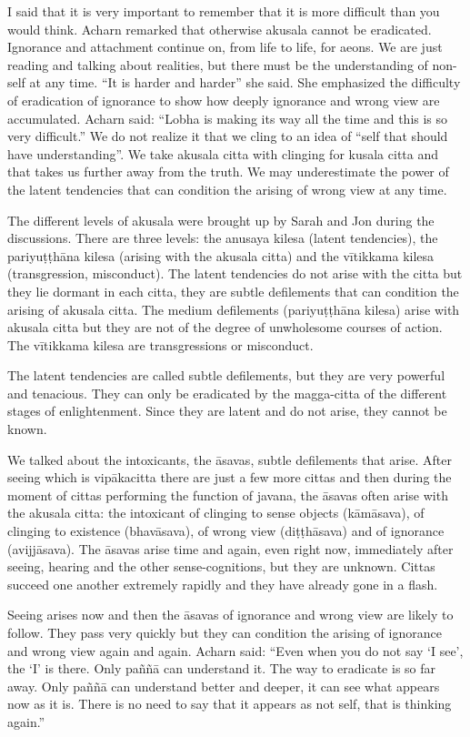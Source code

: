 {I said that it is very
important to remember that it is more difficult than you
would think. Acharn remarked that otherwise akusala cannot be
eradicated. Ignorance and attachment continue on, from life to life, for
aeons. We are just reading and talking about realities, but there must
be the understanding of non-self at any time. ``It is harder and
harder'' she said. She emphasized the difficulty of eradication of
ignorance to show how deeply ignorance and wrong view are accumulated.
Acharn said: ``Lobha is making its way all the time and this is so very
difficult.'' We do not realize it that we cling to an idea of ``self
that should have understanding''. We take akusala citta with clinging
for kusala citta and that takes us further away from the truth. We may
underestimate the power of the latent tendencies that can condition the
arising of wrong view at any time. 

The different levels of akusala were brought up by Sarah and
Jon during the discussions. There are three levels: the anusaya kilesa
(latent tendencies), the pariyuṭṭhāna kilesa (arising with the akusala
citta) and the vītikkama kilesa (transgression, misconduct). The latent
tendencies do not arise with the citta but they lie dormant in each
citta, they are subtle defilements that can condition the arising of
akusala citta. The medium defilements (pariyuṭṭhāna
kilesa) arise with akusala citta but they are not of the
degree of unwholesome courses of action. The vītikkama kilesa are
transgressions or misconduct.

The latent tendencies are called subtle defilements, but they
are very powerful and tenacious. They can only be eradicated by the
magga-citta of the different stages of enlightenment. Since they are
latent and do not arise, they cannot be known. 

We talked about the intoxicants, the āsavas, subtle
defilements that arise. After seeing which is vipākacitta there are just
a few more cittas and then during the moment of cittas performing the
function of javana, the āsavas often arise with the akusala citta: the
intoxicant of clinging to sense objects (kāmāsava), of clinging to
existence (bhavāsava), of wrong view (diṭṭhāsava) and of ignorance
(avijjāsava). The āsavas arise time and again, even right now,
immediately after seeing, hearing and the other sense-cognitions, but
they are unknown. Cittas succeed one another extremely rapidly and they
have already gone in a flash. 

Seeing arises now and then the āsavas of ignorance and wrong
view are likely to follow. They pass very quickly but they can condition
the arising of ignorance and wrong view again and again. Acharn said:
``Even when you do not say `I see', the `I' is there. Only paññā can
understand it. The way to eradicate is so far away. Only paññā can
understand better and deeper, it can see what appears now as it is.
There is no need to say that it appears as not self, that is thinking
again.'' 

}
